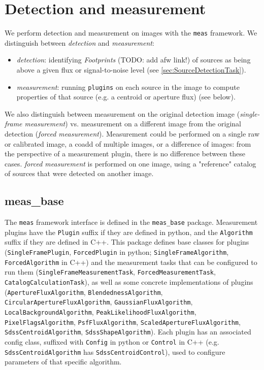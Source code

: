 \section{Detection and measurement}
\label{sec:meas}

We perform detection and measurement on images with the \texttt{meas} framework.
We distinguish between \textit{detection} and \textit{measurement}:
\begin{itemize}
    \item \textit{detection}: identifying \textit{Footprints} (TODO: add afw link!) of sources as being above a given flux or signal-to-noise level (see \ref{sec:SourceDetectionTask}).
    \item \textit{measurement}: running \texttt{plugins} on each source in the image to compute properties of that source (e.g. a centroid or aperture flux) (see below).
\end{itemize}

We also distinguish between measurement on the original detection image (\textit{single-frame measurement}) vs. measurement on a different image from the original detection (\textit{forced measurement}).
Measurement could be performed on a single raw or calibrated image, a coadd of multiple images, or a difference of images: from the perspective of a measurement plugin, there is no difference between these cases.
\textit{forced measurement} is performed on one image, using a "reference" catalog of sources that were detected on another image.

\subsection{meas\_base}
\label{sec:meas_base}

The \texttt{meas} framework interface is defined in the \texttt{meas\_base} package.
Measurement plugins have the \texttt{Plugin} suffix if they are defined in python, and the \texttt{Algorithm} suffix if they are defined in C++.
This package defines base classes for plugins (\texttt{SingleFramePlugin}, \texttt{ForcedPlugin} in python; \texttt{SingleFrameAlgorithm}, \texttt{ForcedAlgorithm} in C++) and the measurement tasks that can be configured to run them (\texttt{SingleFrameMeasurementTask}, \texttt{ForcedMeasurementTask}, \texttt{CatalogCalculationTask}), as well as some concrete implementations of plugins (\texttt{ApertureFluxAlgorithm}, \texttt{BlendednessAlgorithm}, \texttt{CircularApertureFluxAlgorithm}, \texttt{GaussianFluxAlgorithm}, \texttt{LocalBackgroundAlgorithm}, \texttt{PeakLikelihoodFluxAlgorithm}, \texttt{PixelFlagsAlgorithm}, \texttt{PsfFluxAlgorithm}, \texttt{ScaledApertureFluxAlgorithm}, \texttt{SdssCentroidAlgorithm}, \texttt{SdssShapeAlgorithm}).
Each plugin has an associated config class, suffixed with \texttt{Config} in python or \texttt{Control} in C++ (e.g. \texttt{SdssCentroidAlgorithm} has \texttt{SdssCentroidControl}), used to configure parameters of that specific algorithm.

